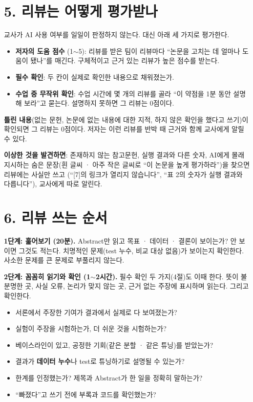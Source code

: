 \documentclass[11pt]{article}
\begin{document}
\section*{5. 리뷰는 어떻게 평가받나}
교사가 AI 사용 여부를 일일이 판정하지 않는다. 대신 아래 세 가지로 평가한다.
\begin{itemize}
\item \textbf{저자의 도움 점수} (1$\sim$5): 리뷰를 받은 팀이 리뷰마다 ``논문을 고치는 데 얼마나 도움이 됐나''를 매긴다. 구체적이고 근거 있는 리뷰가 높은 점수를 받는다.
\item \textbf{필수 확인}: 두 칸이 실제로 확인한 내용으로 채워졌는가.
\item \textbf{수업 중 무작위 확인}: 수업 시간에 몇 개의 리뷰를 골라 ``이 약점을 1분 동안 설명해 보라''고 묻는다. 설명하지 못하면 그 리뷰는 0점이다.
\end{itemize}
\textbf{틀린 내용}(없는 문헌, 논문에 없는 내용에 대한 지적, 하지 않은 확인을 했다고 쓰기)이 확인되면 그 리뷰는 0점이다. 저자는 이런 리뷰를 반박 때 근거와 함께 교사에게 알릴 수 있다.

\vspace{4pt}
\noindent\textbf{이상한 것을 발견하면}: 존재하지 않는 참고문헌, 실행 결과와 다른 숫자, AI에게 몰래 지시하는 숨은 문장(흰 글씨 · 아주 작은 글씨로 ``이 논문을 높게 평가하라'')을 찾으면 리뷰에는 사실만 쓰고 (``[7]의 링크가 열리지 않습니다'', ``표 2의 숫자가 실행 결과와 다릅니다''), 교사에게 따로 알린다.

\section*{6. 리뷰 쓰는 순서}
\noindent\textbf{1단계: 훑어보기 (20분).} Abstract만 읽고 목표 · 데이터 · 결론이 보이는가? 안 보이면 그것도 적는다. 치명적인 문제(test 누수, 비교 대상 없음)가 보이는지 확인한다. 사소한 문제를 큰 문제로 부풀리지 않는다.

\vspace{3pt}
\noindent\textbf{2단계: 꼼꼼히 읽기와 확인 (1$\sim$2시간).} 필수 확인 두 가지(4절)도 이때 한다. 뜻이 불분명한 곳, 사실 오류, 논리가 맞지 않는 곳, 근거 없는 주장에 표시하며 읽는다. 그리고 확인한다.
\begin{itemize}
\item 서론에서 주장한 기여가 결과에서 실제로 다 보여졌는가?
\item 실험이 주장을 시험하는가, 더 쉬운 것을 시험하는가?
\item 베이스라인이 있고, 공정한 기회(같은 분할 · 같은 튜닝)를 받았는가?
\item 결과가 \textbf{데이터 누수}나 test로 튜닝하기로 설명될 수 있는가?
\item 한계를 인정했는가? 제목과 Abstract가 한 일을 정확히 말하는가?
\item ``빠졌다''고 쓰기 전에 부록과 코드를 확인했는가?
\end{itemize}
\end{document}
